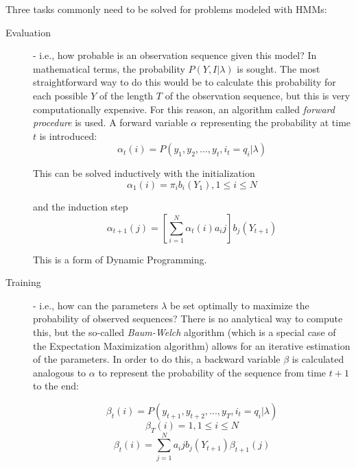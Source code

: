     Three tasks commonly need to be solved for problems modeled with HMMs: 
    \begin{description}
        \item[Evaluation] - i.e., how probable is an observation sequence given this model? 
        In mathematical terms, the probability $P(Y, I | \lambda)$ is sought. 
        The most straightforward way to do this would be to calculate this probability for each possible $Y$ of the length $T$ of the observation sequence, but this is very computationally expensive. 
        For this reason, an algorithm called \textit{forward procedure} is used. 
        A forward variable $\alpha$ representing the probability at time $t$ is introduced:
        \begin{equation}
            \alpha_t(i) = P(y_1, y_2, ..., y_t, i_t = q_i | \lambda )
        \end{equation}

        This can be solved inductively with the initialization
        \begin{equation}
            \alpha_1(i) = \pi_i b_i (Y_1), 1 \leq i \leq N
        \end{equation}

        and the induction step
        \begin{equation}
            \alpha_{t+1}(j) = \left[ \sum_{i=1}^N \alpha_t(i) a_ij \right] b_j (Y_{t+1})
        \end{equation}

        This is a form of Dynamic Programming.

        \item[Training] - i.e., how can the parameters $\lambda$ be set optimally to maximize the probability of observed sequences? 
        There is no analytical way to compute this, but the so-called \textit{Baum-Welch} algorithm (which is a special case of the Expectation Maximization algorithm) allows for an iterative estimation of the parameters. 
        In order to do this, a backward variable $\beta$ is calculated analogous to $\alpha$ to represent the probability of the sequence from time $t+1$ to the end:

        \begin{equation}
            \beta_t(i) = P(y_{t+1}, y_{t+2}, ..., y_T, i_t = q_i | \lambda )
        \end{equation}
        \begin{equation}
            \beta_T(i) = 1, 1 \leq i \leq N
        \end{equation}
        \begin{equation}
            \beta_{t}(i) = \sum_{j=1}^N a_ij b_j (Y_{t+1})\beta_{t+1}(j)
        \end{equation}


\end{description}
